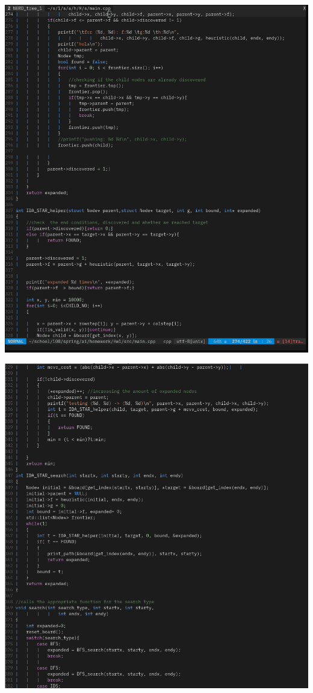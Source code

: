 \documentclass{article}
\begin{document}
\includegraphics[scale=0.5]{sc7.png}

\includegraphics[scale=0.5]{sc8.png}
\end{document}
